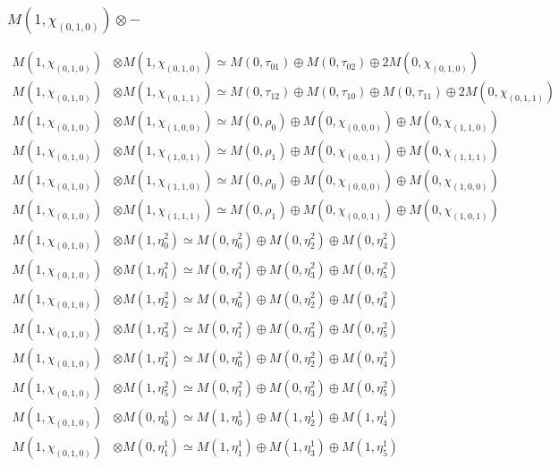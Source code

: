 \subsubsection{$ M(1,\chi_{(0,1,0)})\otimes -$}
\begin{align*}
M(1,\chi_{(0,1,0)}) &\otimes M(1,\chi_{(0,1,0)}) \simeq M(0,\tau_{01}) \oplus M(0,\tau_{02}) \oplus 2 M(0,\chi_{(0,1,0)}) \\
M(1,\chi_{(0,1,0)}) &\otimes M(1,\chi_{(0,1,1)}) \simeq M(0,\tau_{12}) \oplus M(0,\tau_{10}) \oplus M(0,\tau_{11}) \oplus 2 M(0,\chi_{(0,1,1)}) \\
M(1,\chi_{(0,1,0)}) &\otimes M(1,\chi_{(1,0,0)}) \simeq M(0,\rho_{0}) \oplus M(0,\chi_{(0,0,0)}) \oplus M(0,\chi_{(1,1,0)}) \\
M(1,\chi_{(0,1,0)}) &\otimes M(1,\chi_{(1,0,1)}) \simeq M(0,\rho_{1}) \oplus M(0,\chi_{(0,0,1)}) \oplus M(0,\chi_{(1,1,1)}) \\
M(1,\chi_{(0,1,0)}) &\otimes M(1,\chi_{(1,1,0)}) \simeq M(0,\rho_{0}) \oplus M(0,\chi_{(0,0,0)}) \oplus M(0,\chi_{(1,0,0)}) \\
M(1,\chi_{(0,1,0)}) &\otimes M(1,\chi_{(1,1,1)}) \simeq M(0,\rho_{1}) \oplus M(0,\chi_{(0,0,1)}) \oplus M(0,\chi_{(1,0,1)}) \\
M(1,\chi_{(0,1,0)}) &\otimes M(1,\eta^{2}_{0}) \simeq M(0,\eta^{2}_{0}) \oplus M(0,\eta^{2}_{2}) \oplus M(0,\eta^{2}_{4}) \\
M(1,\chi_{(0,1,0)}) &\otimes M(1,\eta^{2}_{1}) \simeq M(0,\eta^{2}_{1}) \oplus M(0,\eta^{2}_{3}) \oplus M(0,\eta^{2}_{5}) \\
M(1,\chi_{(0,1,0)}) &\otimes M(1,\eta^{2}_{2}) \simeq M(0,\eta^{2}_{0}) \oplus M(0,\eta^{2}_{2}) \oplus M(0,\eta^{2}_{4}) \\
M(1,\chi_{(0,1,0)}) &\otimes M(1,\eta^{2}_{3}) \simeq M(0,\eta^{2}_{1}) \oplus M(0,\eta^{2}_{3}) \oplus M(0,\eta^{2}_{5}) \\
M(1,\chi_{(0,1,0)}) &\otimes M(1,\eta^{2}_{4}) \simeq M(0,\eta^{2}_{0}) \oplus M(0,\eta^{2}_{2}) \oplus M(0,\eta^{2}_{4}) \\
M(1,\chi_{(0,1,0)}) &\otimes M(1,\eta^{2}_{5}) \simeq M(0,\eta^{2}_{1}) \oplus M(0,\eta^{2}_{3}) \oplus M(0,\eta^{2}_{5}) \\
M(1,\chi_{(0,1,0)}) &\otimes M(0,\eta^{1}_{0}) \simeq M(1,\eta^{1}_{0}) \oplus M(1,\eta^{1}_{2}) \oplus M(1,\eta^{1}_{4}) \\
M(1,\chi_{(0,1,0)}) &\otimes M(0,\eta^{1}_{1}) \simeq M(1,\eta^{1}_{1}) \oplus M(1,\eta^{1}_{3}) \oplus M(1,\eta^{1}_{5}) \\

\end{align*}
